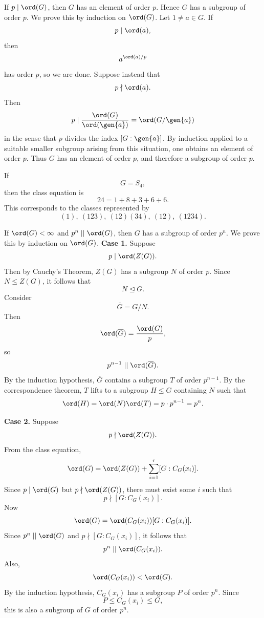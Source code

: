 \begin{theorem}{
    If $p\mid \ord(G)$, then $G$ has an element of order $p$.
    Hence $G$ has a subgroup of order $p$.
}
    We prove this by induction on $\ord(G)$.
    Let $1\neq a\in G$.
    If
    \[
        p\mid \ord(a),
    \]
    then
    \[
        a^{\ord(a)/p}
    \]
    has order $p$, so we are done.
    Suppose instead that
    \[
        p\nmid \ord(a).
    \]
    Then
    \[
        p\mid \frac{\ord(G)}{\ord(\gen{a})} = \ord(G/\gen{a})
    \]
    in the sense that $p$ divides the index $[G:\gen{a}]$.
    By induction applied to a suitable smaller subgroup arising from this situation, one obtains an element of order $p$.
    Thus $G$ has an element of order $p$, and therefore a subgroup of order $p$.
\end{theorem}

\begin{example}
    If
    \[
        G=S_4,
    \]
    then the class equation is
    \[
        24=1+8+3+6+6.
    \]
    This corresponds to the classes represented by
    \[
        (1),\ (123),\ (12)(34),\ (12),\ (1234).
    \]
\end{example}

\begin{theorem}{
    If $\ord(G)<\infty$ and $p^n\mid\mid \ord(G)$, then $G$ has a subgroup of order $p^n$.
}
    We prove this by induction on $\ord(G)$.
    \textbf{Case 1.}
    Suppose
    \[
        p\mid \ord(Z(G)).
    \]
    Then by Cauchy's Theorem, $Z(G)$ has a subgroup $N$ of order $p$.
    Since $N\leq Z(G)$, it follows that
    \[
        N\trianglelefteq G.
    \]
    Consider
    \[
        \overline{G}=G/N.
    \]
    Then
    \[
        \ord(\overline{G})=\frac{\ord(G)}{p},
    \]
    so
    \[
        p^{n-1}\mid\mid \ord(\overline{G}).
    \]
    By the induction hypothesis, $\overline{G}$ contains a subgroup $T$ of order $p^{n-1}$.
    By the correspondence theorem, $T$ lifts to a subgroup $H\leq G$ containing $N$ such that
    \[
        \ord(H)=\ord(N)\ord(T)=p\cdot p^{n-1}=p^n.
    \]

    \textbf{Case 2.}
    Suppose
    \[
        p\nmid \ord(Z(G)).
    \]
    From the class equation,
    \[
        \ord(G)=\ord(Z(G))+\sum_{i=1}^r [G:C_G(x_i)].
    \]
    Since $p\mid \ord(G)$ but $p\nmid \ord(Z(G))$, there must exist some $i$ such that
    \[
        p\nmid [G:C_G(x_i)].
    \]
    Now
    \[
        \ord(G)=\ord(C_G(x_i))[G:C_G(x_i)].
    \]
    Since $p^n\mid\mid \ord(G)$ and $p\nmid [G:C_G(x_i)]$, it follows that
    \[
        p^n\mid\mid \ord(C_G(x_i)).
    \]
    Also,
    \[
        \ord(C_G(x_i))<\ord(G).
    \]
    By the induction hypothesis, $C_G(x_i)$ has a subgroup $P$ of order $p^n$.
    Since
    \[
        P\leq C_G(x_i)\leq G,
    \]
    this is also a subgroup of $G$ of order $p^n$.
\end{theorem}

